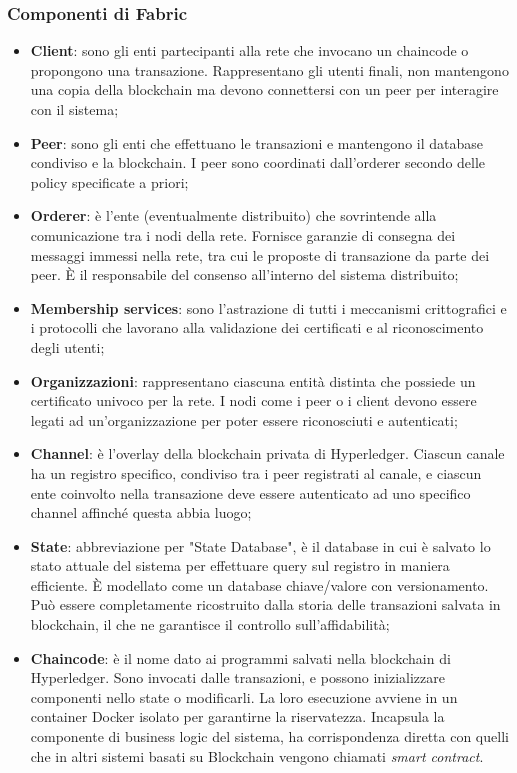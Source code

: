 		\subsubsection{Componenti di Fabric}
			\begin{itemize}
				\item \textbf{Client}: sono gli enti partecipanti alla rete che invocano un chaincode o propongono una transazione. Rappresentano gli utenti finali, non mantengono una copia della blockchain ma devono connettersi con un peer per interagire con il sistema;
				\item \textbf{Peer}: sono gli enti che effettuano le transazioni e mantengono il database condiviso e la blockchain. I peer sono coordinati dall'orderer secondo delle policy specificate a priori;
				\item \textbf{Orderer}: è l'ente (eventualmente distribuito) che sovrintende alla comunicazione tra i nodi della rete. Fornisce garanzie di consegna dei messaggi immessi nella rete, tra cui le proposte di transazione da parte dei peer. È il responsabile del consenso all'interno del sistema distribuito;
				\item \textbf{Membership services}: sono l'astrazione di tutti i meccanismi crittografici e i protocolli che lavorano alla validazione dei certificati e al riconoscimento degli utenti; 
				\item \textbf{Organizzazioni}: rappresentano ciascuna entità distinta che possiede un certificato univoco per la rete. I nodi come i peer o i client devono essere legati ad un'organizzazione per poter essere riconosciuti e autenticati;
				\item \textbf{Channel}: è l'overlay della blockchain privata di Hyperledger. Ciascun canale ha un registro specifico, condiviso tra i peer registrati al canale, e ciascun ente coinvolto nella transazione deve essere autenticato ad uno specifico channel affinché questa abbia luogo;
				\item \textbf{State}: abbreviazione per "State Database", è il database in cui è salvato lo stato attuale del sistema per effettuare query sul registro in maniera efficiente. È modellato come un database chiave/valore con versionamento. Può essere completamente ricostruito dalla storia delle transazioni salvata in blockchain, il che ne garantisce il controllo sull'affidabilità;
				\item \textbf{Chaincode}: è il nome dato ai programmi salvati nella blockchain di Hyperledger. Sono invocati dalle transazioni, e possono inizializzare componenti nello state o modificarli. La loro esecuzione avviene in un container Docker isolato per garantirne la riservatezza. Incapsula la componente di business logic del sistema, ha corrispondenza diretta con quelli che in altri sistemi basati su Blockchain vengono chiamati \emph{smart contract}.

\end{itemize}
